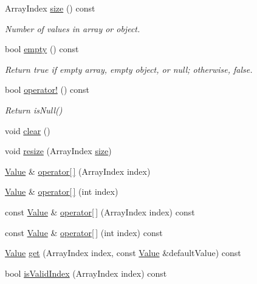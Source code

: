 \begin{DoxyCompactItemize}
\item 
Array\+Index \hyperlink{classJson_1_1Value_a4ca8ee6c48a34ca6c2f131956bab5e05}{size} () const \hypertarget{classJson_1_1Value_a4ca8ee6c48a34ca6c2f131956bab5e05}{}\label{classJson_1_1Value_a4ca8ee6c48a34ca6c2f131956bab5e05}

\begin{DoxyCompactList}\small\item\em Number of values in array or object. \end{DoxyCompactList}\item 
bool \hyperlink{classJson_1_1Value_a99c42d3ff8495dad1e91b43e66553c36}{empty} () const \hypertarget{classJson_1_1Value_a99c42d3ff8495dad1e91b43e66553c36}{}\label{classJson_1_1Value_a99c42d3ff8495dad1e91b43e66553c36}

\begin{DoxyCompactList}\small\item\em Return true if empty array, empty object, or null; otherwise, false. \end{DoxyCompactList}\item 
bool \hyperlink{classJson_1_1Value_a021ab0d15a807fbe051446c9c545ab61}{operator!} () const \hypertarget{classJson_1_1Value_a021ab0d15a807fbe051446c9c545ab61}{}\label{classJson_1_1Value_a021ab0d15a807fbe051446c9c545ab61}

\begin{DoxyCompactList}\small\item\em Return is\+Null() \end{DoxyCompactList}\item 
void \hyperlink{classJson_1_1Value_a501a4d67e6c875255c2ecc03ccd2019b}{clear} ()
\item 
void \hyperlink{classJson_1_1Value_aa284353271ada427dbfa04a42f2be407}{resize} (Array\+Index \hyperlink{classJson_1_1Value_a4ca8ee6c48a34ca6c2f131956bab5e05}{size})
\item 
\hyperlink{classJson_1_1Value}{Value} \& \hyperlink{classJson_1_1Value_a7d99f5dba388cdaa152ce6ef933d64ef}{operator\mbox{[}$\,$\mbox{]}} (Array\+Index index)
\item 
\hyperlink{classJson_1_1Value}{Value} \& \hyperlink{classJson_1_1Value_ac9182982c361e0ab621134d406e5f250}{operator\mbox{[}$\,$\mbox{]}} (int index)
\item 
const \hyperlink{classJson_1_1Value}{Value} \& \hyperlink{classJson_1_1Value_af151919e8947c430e34bed2b0b128601}{operator\mbox{[}$\,$\mbox{]}} (Array\+Index index) const 
\item 
const \hyperlink{classJson_1_1Value}{Value} \& \hyperlink{classJson_1_1Value_af9e02b38f4e63e491c300c20b275bdd7}{operator\mbox{[}$\,$\mbox{]}} (int index) const 
\item 
\hyperlink{classJson_1_1Value}{Value} \hyperlink{classJson_1_1Value_a28282c9b76fa031eba7a1843c47c16fe}{get} (Array\+Index index, const \hyperlink{classJson_1_1Value}{Value} \&default\+Value) const 
\item 
bool \hyperlink{classJson_1_1Value_aaa82ebb4b730ea1567d310874f47d147}{is\+Valid\+Index} (Array\+Index index) const \hypertarget{classJson_1_1Value_aaa82ebb4b730ea1567d310874f47d147}{}\label{classJson_1_1Value_aaa82ebb4b730ea1567d310874f47d147}


\end{DoxyCompactItemize}
